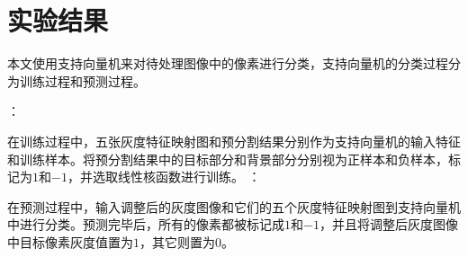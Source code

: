 \section{实验结果}
本文使用支持向量机来对待处理图像中的像素进行分类，支持向量机的分类过程分为训练过程和预测过程。
\begin{enumerate}
：

    在训练过程中，五张灰度特征映射图和预分割结果分别作为支持向量机的输入特征和训练样本。将预分割结果中的目标部分和背景部分分别视为正样本和负样本，标记为$1$和$-1$，并选取线性核函数进行训练。
：

    在预测过程中，输入调整后的灰度图像和它们的五个灰度特征映射图到支持向量机中进行分类。预测完毕后，所有的像素都被标记成$1$和$-1$，并且将调整后灰度图像中目标像素灰度值置为$1$，其它则置为$0$。
\end{enumerate}

